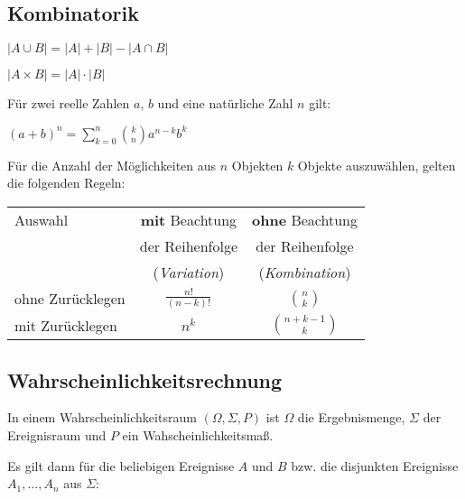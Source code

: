 \documentclass[8pt,landscape]{scrartcl}
\providecommand{\tightlist}{%
  \setlength{\itemsep}{0pt}\setlength{\parskip}{0pt}}
\begin{document}
\begin{multicols}{3}
\subsection{Kombinatorik}\label{kombinatorik}

\begin{description}
\tightlist
\item[Summenregel]
\(|A \cup B| = |A| + |B| - |A \cap B|\)
\item[Produktregel]
\(|A \times B| = |A| \cdot |B|\)
\item[Binomischer Lehrsatz]
Für zwei reelle Zahlen \(a\), \(b\) und eine natürliche Zahl \(n\) gilt:

\((a+b)^n = \sum\limits_{k=0}^{n} \binom{k}{n} a^{n-k}b^{k}\)
\end{description}

Für die Anzahl der Möglichkeiten aus \(n\) Objekten \(k\) Objekte
auszuwählen, gelten die folgenden Regeln:

\begin{center}
    \begin{tabular}{lcc}
        \toprule
        Auswahl & \textbf{mit} Beachtung    & \textbf{ohne} Beachtung   \\
        ~       & der Reihenfolge           & der Reihenfolge           \\
        ~       & (\textit{Variation})      & (\textit{Kombination})    \\
        \midrule
        ohne Zurücklegen & $\displaystyle\frac{n!}{(n-k)!}$ & $\displaystyle\binom{n}{k}$ \\
        \midrule
        mit  Zurücklegen & $\displaystyle n^k$              & $\displaystyle\binom{n+k-1}{k}$ \\
        \bottomrule
    \end{tabular}
\end{center}

\subsection{Wahrscheinlichkeitsrechnung}\label{wahrscheinlichkeitsrechnung}

In einem Wahrscheinlichkeitsraum \((\Omega, \Sigma, P)\) ist \(\Omega\)
die Ergebnismenge, \(\Sigma\) der Ereignisraum und \(P\) ein
Wahscheinlichkeitsmaß.

Es gilt dann für die beliebigen Ereignisse \(A\) und \(B\) bzw. die
disjunkten Ereignisse \(A_1,...,A_n\) aus \(\Sigma\):


\end{multicols}
\end{document}
